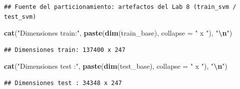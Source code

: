 \documentclass[
]{article}
\newenvironment{Shaded}{\begin{snugshade}}{\end{snugshade}}
\newcommand{\AttributeTok}[1]{\textcolor[rgb]{0.13,0.29,0.53}{#1}}
\newcommand{\FunctionTok}[1]{\textcolor[rgb]{0.13,0.29,0.53}{\textbf{#1}}}
\newcommand{\NormalTok}[1]{#1}
\newcommand{\SpecialCharTok}[1]{\textcolor[rgb]{0.81,0.36,0.00}{\textbf{#1}}}
\newcommand{\StringTok}[1]{\textcolor[rgb]{0.31,0.60,0.02}{#1}}
\begin{document}
\begin{verbatim}
## Fuente del particionamiento: artefactos del Lab 8 (train_svm / test_svm)
\end{verbatim}

\begin{Shaded}
\begin{Highlighting}[]
\FunctionTok{cat}\NormalTok{(}\StringTok{"Dimensiones train:"}\NormalTok{, }\FunctionTok{paste}\NormalTok{(}\FunctionTok{dim}\NormalTok{(train\_base), }\AttributeTok{collapse =} \StringTok{" x "}\NormalTok{), }\StringTok{"}\SpecialCharTok{\textbackslash{}n}\StringTok{"}\NormalTok{)}
\end{Highlighting}
\end{Shaded}

\begin{verbatim}
## Dimensiones train: 137400 x 247
\end{verbatim}

\begin{Shaded}
\begin{Highlighting}[]
\FunctionTok{cat}\NormalTok{(}\StringTok{"Dimensiones test :"}\NormalTok{, }\FunctionTok{paste}\NormalTok{(}\FunctionTok{dim}\NormalTok{(test\_base),  }\AttributeTok{collapse =} \StringTok{" x "}\NormalTok{), }\StringTok{"}\SpecialCharTok{\textbackslash{}n}\StringTok{"}\NormalTok{)}
\end{Highlighting}
\end{Shaded}

\begin{verbatim}
## Dimensiones test : 34348 x 247
\end{verbatim}
\end{document}
